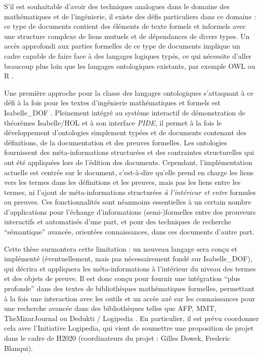\documentclass[a4paper,10pt]{article}
\begin{document}
S'il est souhaitable d'avoir des techniques analogues
dans le domaine des mathématiques et de l'ingénierie,
il existe des défis particuliers dans ce domaine :
ce type de documents contient des éléments de texte formels et informels
avec une structure complexe de liens mutuels et de dépendances de divers types.
Un accès approfondi aux parties formelles de ce type de documents implique
un cadre capable de faire face à des langages logiques typés,
ce qui nécessite d'aller beaucoup plus loin
que les langages ontologiques existants,
par exemple OWL ou R \cite {owl2012,protege,owlgred,rontorium}.

Une première approche pour la classe des langages ontologiques
s'attaquant à ce défi
à la fois pour les textes d'ingénierie mathématiques et formels est
Isabelle\_DOF
\cite{
  Brucker-ea.Using-CICM18,
  BruckerWolff.Design-SEFM19,
  BruckerWolff.Certif-IFM19%
}.
Pleinement intégré
au système interactif de démonstration de théorèmes Isabelle/HOL
et à son interface \emph{PIDE},
il permet à la fois le développement d'ontologies simplement typées
et de documents contenant des définitions, de la documentation
et des preuves formelles.
Les ontologies fournissent des méta-informations structurées
et des contraintes structurelles
qui ont été appliquées lors de l'édition des documents.
Cependant, l'implémentation actuelle est centrée sur le document,
c'est-à-dire qu'elle prend en charge les liens vers les termes
dans les définitions et les preuves,
mais pas les liens entre les termes,
ni l'ajout de méta-informations structurées
\emph{à l'intérieur et entre} formules ou preuves.
Ces fonctionnalités sont néanmoins
essentielles à un certain nombre d'applications
pour l'échange d'informations (semi-)formelles
entre des prouveurs interactifs et automatisés d'une part,
et pour des techniques de recherche \enquote{sémantique} avancée,
orientées connaissances, dans ces documents d'autre part.

Cette thèse surmontera cette limitation :
un nouveau langage sera conçu et implémenté
(éventuellement, mais pas nécessairement fondé sur Isabelle\_DOF),
qui décrira et appliquera les méta-informations
à l'intérieur du niveau des termes et des objets de preuve.
Il est donc conçu pour fournir une intégration \enquote{plus profonde}
dans des textes de bibliothèques mathématiques formelles,
permettant à la fois une interaction avec les outils
et un accès axé sur les connaissances
pour une recherche avancée dans des bibliothèques
telles que AFP, MMT, TheMizarJournal ou Dedukti / Logipedia
\cite {afp,mmt,TheMizarJournal,dedukti}.
En particulier, il est prévu coordonner cela
avec l'Initiative Logipedia,
qui vient de soumettre une proposition de projet dans le cadre de H2020
(coordinateurs du projet : Gilles Dowek, Frederic Blanqui).
\end{document}
